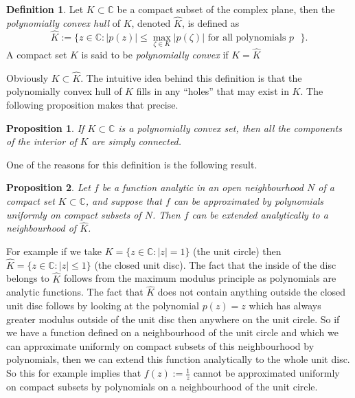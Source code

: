 \documentclass[12pt]{article}
\theoremstyle{theorem}
\newtheorem*{prop}{Proposition}
\theoremstyle{definition}
\newtheorem*{defn}{Definition}
\begin{document}
\begin{defn}
Let $K \subset {\mathbb{C}}$ be a compact subset of the complex plane,
then the {\em polynomially convex hull} of $K$, denoted $\hat{K}$, is defined as
\begin{equation*}
\hat{K} :=
\{ z \in {\mathbb{C}} : \lvert p(z) \rvert \leq \max_{\zeta \in K} \lvert p(\zeta) \rvert \text{ for all polynomials $p$ } \}.
\end{equation*}
A compact set $K$ is said to be {\em polynomially convex} if
$K = \hat{K}$
\end{defn}

Obviously $K \subset \hat{K}$.  The intuitive idea behind this definition is that the polynomially convex hull of $K$ fills in any ``holes'' that may exist in $K$.
The following proposition makes that precise.

\begin{prop}
If $K \subset {\mathbb{C}}$ is a polynomially convex set, then
all the components of the interior of $K$ are simply connected.
\end{prop}

One of the reasons for this definition is the following result.

\begin{prop}
Let $f$ be a function analytic in an open neighbourhood $N$ of a compact set
$K \subset
{\mathbb{C}}$, and suppose that $f$ can be approximated by polynomials uniformly
on compact subsets of $N$.  Then $f$ can be extended analytically to a neighbourhood of $\hat{K}$.
\end{prop}

For example if we take $K = \{ z \in {\mathbb{C}} : \lvert z \rvert = 1 \}$
(the unit circle)
then $\hat{K} = \{ z \in {\mathbb{C}} : \lvert z \rvert \leq 1 \}$ (the
closed unit disc).  The fact that the inside of the disc belongs to
$\hat{K}$ follows from the maximum modulus principle as polynomials are analytic functions.  The fact that $\hat{K}$ does not contain anything outside the
closed unit disc follows by looking at the polynomial $p(z) = z$ which has
always greater modulus outside of the unit disc then anywhere on the unit circle.  So if we have a function defined on a neighbourhood of the unit circle
and which we can approximate uniformly on compact subsets of this
neighbourhood
by polynomials, then we can extend this function analytically
to the whole unit disc.  So this for example implies that $f(z) := \frac{1}{z}$
cannot be approximated uniformly on compact subsets by polynomials on a
neighbourhood of the unit circle.
\end{document}
